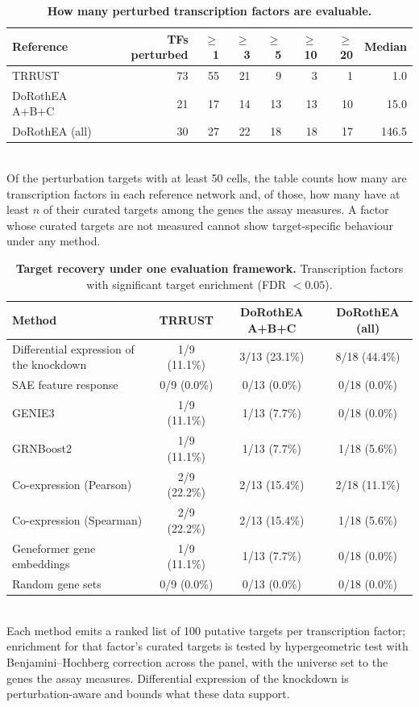 \documentclass[11pt]{article}
\begin{document}
\begin{table}[htbp]
\centering
\caption{\textbf{How many perturbed transcription factors are evaluable.}}
\label{tab:evaluability}
\smallskip
\small
\begin{tabular}{lrrrrrrr}
\toprule
Reference & TFs perturbed & $\geq$1 & $\geq$3 & $\geq$5 & $\geq$10 & $\geq$20 & Median \\
\midrule
TRRUST & 73 & 55 & 21 & 9 & 3 & 1 & 1.0 \\
DoRothEA A+B+C & 21 & 17 & 14 & 13 & 13 & 10 & 15.0 \\
DoRothEA (all) & 30 & 27 & 22 & 18 & 18 & 17 & 146.5 \\
\bottomrule
\end{tabular}
\\[2pt]
\footnotesize Of the perturbation targets with at least 50 cells, the table counts how many are transcription factors in each reference network and, of those, how many have at least $n$ of their curated targets among the genes the assay measures. A factor whose curated targets are not measured cannot show target-specific behaviour under any method.
\end{table}

\begin{table}[htbp]
\centering
\caption{\textbf{Target recovery under one evaluation framework.} Transcription factors with significant target enrichment (FDR $< 0.05$).}
\label{tab:ceiling}
\smallskip
\small
\begin{tabular}{lccc}
\toprule
Method & TRRUST & DoRothEA A+B+C & DoRothEA (all) \\
\midrule
Differential expression of the knockdown & 1/9 (11.1\%) & 3/13 (23.1\%) & 8/18 (44.4\%) \\
SAE feature response & 0/9 (0.0\%) & 0/13 (0.0\%) & 0/18 (0.0\%) \\
GENIE3 & 1/9 (11.1\%) & 1/13 (7.7\%) & 0/18 (0.0\%) \\
GRNBoost2 & 1/9 (11.1\%) & 1/13 (7.7\%) & 1/18 (5.6\%) \\
Co-expression (Pearson) & 2/9 (22.2\%) & 2/13 (15.4\%) & 2/18 (11.1\%) \\
Co-expression (Spearman) & 2/9 (22.2\%) & 2/13 (15.4\%) & 1/18 (5.6\%) \\
Geneformer gene embeddings & 1/9 (11.1\%) & 1/13 (7.7\%) & 0/18 (0.0\%) \\
Random gene sets & 0/9 (0.0\%) & 0/13 (0.0\%) & 0/18 (0.0\%) \\
\bottomrule
\end{tabular}
\\[2pt]
\footnotesize Each method emits a ranked list of 100 putative targets per transcription factor; enrichment for that factor's curated targets is tested by hypergeometric test with Benjamini--Hochberg correction across the panel, with the universe set to the genes the assay measures. Differential expression of the knockdown is perturbation-aware and bounds what these data support.
\end{table}
\end{document}
